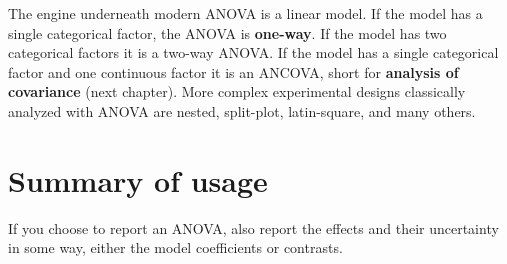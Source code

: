 \documentclass[]{book}
\begin{document}
The engine underneath modern ANOVA is a linear model. If the model has a
single categorical factor, the ANOVA is \textbf{one-way}. If the model
has two categorical factors it is a two-way ANOVA. If the model has a
single categorical factor and one continuous factor it is an ANCOVA,
short for \textbf{analysis of covariance} (next chapter). More complex
experimental designs classically analyzed with ANOVA are nested,
split-plot, latin-square, and many others.

\section{Summary of usage}\label{summary-of-usage}

If you choose to report an ANOVA, also report the effects and their
uncertainty in some way, either the model coefficients or contrasts.
\end{document}
